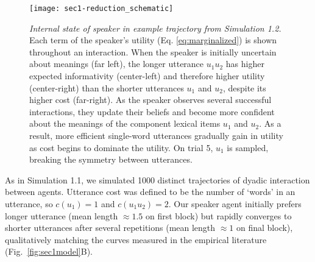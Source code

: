 

\begin{figure*}[t]
\centering
    \texttt{[image: sec1-reduction\_schematic]}
    \vspace{1em}
  \caption{\emph{Internal state of speaker in example trajectory from Simulation 1.2.} Each term of the speaker's utility (Eq. \ref{eq:marginalized}) is shown throughout an interaction. When the speaker is initially uncertain about meanings (far left), the longer utterance $u_1u_2$ has higher expected informativity (center-left) and therefore higher utility (center-right) than the shorter utterances $u_1$ and $u_2$, despite its higher cost (far-right). As the speaker observes several successful interactions, they update their beliefs and become more confident about the meanings of the component lexical items $u_1$ and $u_2$. As a result, more efficient single-word utterances gradually gain in utility as cost begins to dominate the utility. On trial 5, $u_1$ is sampled, breaking the symmetry between utterances.}
  \label{fig:sec1internals}
\end{figure*}

As in Simulation 1.1, we simulated 1000 distinct trajectories of dyadic interaction between agents.
Utterance cost was defined to be the number of `words' in an utterance, so $c(u_1) =1$ and $c(u_1u_2)=2$.
Our speaker agent initially prefers longer utterance (mean length $\approx 1.5$ on first block) but rapidly converges to shorter utterances after several repetitions (mean length $\approx 1$ on final block), qualitatively matching the curves measured in the empirical literature (Fig.~\ref{fig:sec1model}B).

